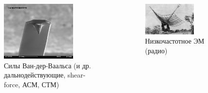 \documentclass[9pt, compress, xcolor=table]{beamer}
\begin{document}
\begin{frame}[fragile]
\begin{columns}[c]
\begin{figure}
\centering
\includegraphics[width=0.75\textwidth]{afm}
\\ \small{Силы Ван-дер-Ваальса (и др. дальнодействующие, shear-force, АСМ, СТМ)}
\end{figure}
\begin{figure}
\centering
\includegraphics[width=0.75\textwidth]{radio}
\\ \small{Низкочастотное ЭМ (радио)}
\end{figure}

\end{columns}
\end{frame}
\end{document}

